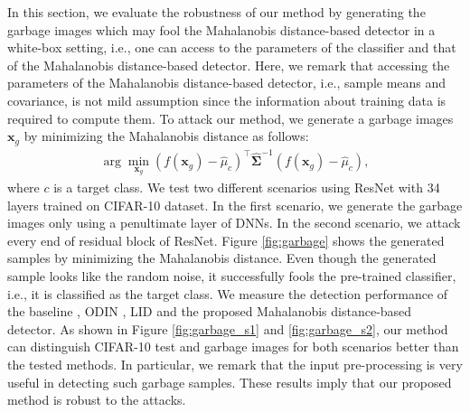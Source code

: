 \documentclass{article}
\begin{document}
In this section, we evaluate the robustness of our method by generating the garbage images which may fool the Mahalanobis distance-based detector in a white-box setting, i.e., one can access to the parameters of the classifier and that of the Mahalanobis distance-based detector.
Here, we remark that accessing the parameters of the Mahalanobis distance-based detector, i.e., sample means and covariance, is not mild assumption since the information about training data is required to compute them.
To attack our method, we generate a garbage images $\mathbf{x}_{g}$ by minimizing the Mahalanobis distance as follows:
\begin{align*}
\arg \min_{\mathbf{x}_{g}}
 \left( f(\mathbf{x}_{g}) - {\widehat \mu}_{c}\right)^\top \mathbf{\widehat \Sigma}^{-1} \left( f(\mathbf{x}_{g}) - {\widehat \mu}_{c}\right),
\end{align*}
where $c$ is a target class.
We test two different scenarios using ResNet with 34 layers trained on CIFAR-10 dataset.
In the first scenario, 
we generate the garbage images only using a penultimate layer of DNNs. In the second scenario, we attack every end of residual block of ResNet.
Figure \ref{fig:garbage} shows the generated samples by minimizing the Mahalanobis distance.
Even though the generated sample looks like the random noise,
it successfully fools the pre-trained classifier, i.e., it is classified as the target class.
We measure the detection performance of the baseline \citep{hendrycks2016baseline}, ODIN \citep{liang2017principled}, LID \citep{ma2018characterizing} and the proposed Mahalanobis distance-based detector.
As shown in Figure \ref{fig:garbage_s1} and \ref{fig:garbage_s2},
our method can distinguish CIFAR-10 test and garbage images for both scenarios better than the tested methods.
In particular, we remark that the input pre-processing is very useful in detecting such garbage samples.
These results imply that our proposed method is robust to the attacks.

\iffalse
\subsection{Adaptive attack: optimization-based adversarial attack}

Formally, we generate an adversarial examples as follows:
\begin{align*}
    \arg \min_{\mathbf{x}_{adv}} ~~ \lambda d(\mathbf{x},\mathbf{x}_{adv}) + \ell(y^{\prime}, P(y|\mathbf{x}_{adv})) + \left( f(\mathbf{x}_{adv}) - {\widehat \mu}_{y^{\prime}}\right)^\top \mathbf{\widehat \Sigma}^{-1} \left( f(\mathbf{x}_{adv}) - {\widehat \mu}_{y^{\prime}}\right)
\end{align*}
where $y^{\prime}$ is the label corresponding to the second largest output of the classifier, $\lambda$ is penalty parameter and $d(\cdot,\cdot)$ is a metric to quantify the distance between an original image and its adversarial counterpart.
\fi
\end{document}
